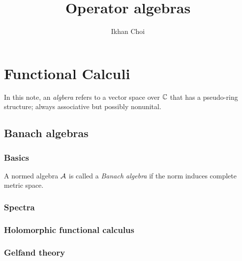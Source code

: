 \documentclass{../note}
\begin{document}
\title{Operator algebras}
\author{Ikhan Choi}
\maketitle
\tableofcontents

\chapter{Functional Calculi}

\begin{defn*}
In this note, an \emph{algbera} refers to a vector space over $\mathbb{C}$ that has a pseudo-ring structure; always associative but possibly nonunital.
\end{defn*}

\section{Banach algebras}

\subsection{Basics}
\begin{defn}
A normed algebra $\mathcal{A}$ is called a \emph{Banach algebra} if the norm induces complete metric space.
\end{defn}


\subsection{Spectra}





\subsection{Holomorphic functional calculus}



\subsection{Gelfand theory}
\end{document}
